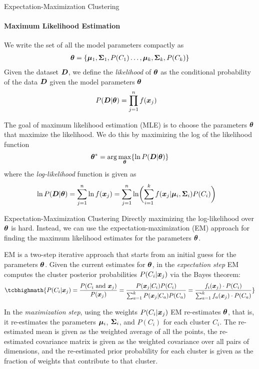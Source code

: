 \begin{frame}{Expectation-Maximization Clustering}
\framesubtitle{Maximum Likelihood Estimation}

  \small
We write the set of all the model parameters compactly as
\begin{align*}
    {\bm \theta} = \left\{{\bm \mu}_1,{\bm \Sigma}_1,P(C_1) \dots, {\bm \mu}_k, {\bm \Sigma}_k,
   P(C_k)\right\}
\end{align*}
Given the dataset ${\boldsymbol D}$, we def\/{i}ne the {\em likelihood} of
${\bm \theta}$ as the conditional probability of the data ${\boldsymbol D}$ given
the model parameters ${\bm \theta}$
\begin{align*}
P({\boldsymbol D} | {\bm \theta}) & = \prod_{j=1}^n f({\boldsymbol x}_{j})
\end{align*}

The goal of maximum likelihood estimation (MLE) is to choose the
parameters ${\bm \theta}$ that maximize the likelihood. We do this by
maximizing the log of the likelihood function
\begin{align*}
    {\bm \theta}^* = \arg\max_{{\bm \theta}} \{\ln P({\boldsymbol D} | {\bm \theta})\}
\end{align*}
where the {\em log-likelihood} function is given as
\begin{align*}
    \ln P({\boldsymbol D} | {\bm \theta}) & = \sum_{j=1}^n \ln f({\boldsymbol x}_{j})
    = \sum_{j=1}^n \ln \biggl( \sum_{i=1}^k f({\boldsymbol x}_{j} | {\bm \mu}_i,
{\bm \Sigma}_i)P(C_i)\biggr)
\end{align*}
\end{frame}


\begin{frame}{Expectation-Maximization Clustering}
Directly maximizing the log-likelihood over ${\bm \theta}$ is hard.
Instead, we can use the
expectation-maximization (EM)
approach for f\/{i}nding the maximum likelihood estimates
for the parameters ${\bm \theta}$.

\medskip
EM is a two-step iterative approach that
starts from an initial guess for the parameters ${\bm \theta}$.
Given the current estimates for ${\bm \theta}$, in the {\em expectation step}
EM computes the cluster posterior probabilities $P(C_i|{\boldsymbol x}_{j})$ via the Bayes
theorem:
\begin{align*}
\tcbhighmath{
  P(C_i | \bx_{j}) = \frac{P(C_i \mbox{ and } \bx_{j})}{P(\bx_{j})} =
  \frac{P(\bx_{j} | C_i) P(C_i)}{\sum_{a=1}^k P(\bx_{j} | C_a) P(C_a)}
 = \frac{f_i(\bx_{j}) \cdot P(C_{i})}
    {\sum_{a=1}^k f_a(\bx_{j}) \cdot P(C_{a})}
}
\end{align*}

In the {\em maximization step}, using the weights
$P(C_i|{\boldsymbol x}_{j})$ EM re-estimates ${\bm \theta}$, that is, it re-estimates the parameters ${\bm \mu}_i$, ${\bm \Sigma}_i$,
and $P(C_i)$ for each cluster $C_i$.
The re-estimated mean is given as the weighted average of
all the points, the re-estimated covariance matrix is given as
the weighted covariance over all pairs of dimensions, and the
re-estimated prior probability for each cluster is given as the
fraction of weights that contribute to that cluster.
\end{frame}



